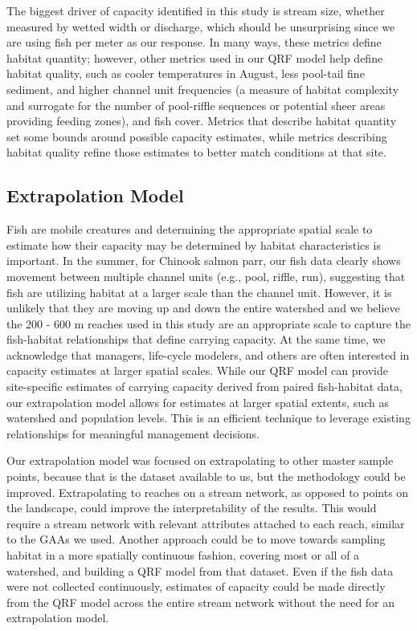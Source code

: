 \documentclass[
  12pt,
]{article}
\begin{document}
The biggest driver of capacity identified in this study is stream size, whether measured by wetted width or discharge, which should be unsurprising since we are using fish per meter as our response. In many ways, these metrics define habitat quantity; however, other metrics used in our QRF model help define habitat quality, such as cooler temperatures in August, less pool-tail fine sediment, and higher channel unit frequencies (a measure of habitat complexity and surrogate for the number of pool-riffle sequences or potential sheer areas providing feeding zones), and fish cover. Metrics that describe habitat quantity set some bounds around possible capacity estimates, while metrics describing habitat quality refine those estimates to better match conditions at that site.

\hypertarget{extrapolation-model}{%
\subsection{Extrapolation Model}\label{extrapolation-model}}

Fish are mobile creatures and determining the appropriate spatial scale to estimate how their capacity may be determined by habitat characteristics is important. In the summer, for Chinook salmon parr, our fish data clearly shows movement between multiple channel units (e.g., pool, riffle, run), suggesting that fish are utilizing habitat at a larger scale than the channel unit. However, it is unlikely that they are moving up and down the entire watershed and we believe the 200 - 600 m reaches used in this study are an appropriate scale to capture the fish-habitat relationships that define carrying capacity. At the same time, we acknowledge that managers, life-cycle modelers, and others are often interested in capacity estimates at larger spatial scales. While our QRF model can provide site-specific estimates of carrying capacity derived from paired fish-habitat data, our extrapolation model allows for estimates at larger spatial extents, such as watershed and population levels. This is an efficient technique to leverage existing relationships for meaningful management decisions.

Our extrapolation model was focused on extrapolating to other master sample points, because that is the dataset available to us, but the methodology could be improved. Extrapolating to reaches on a stream network, as opposed to points on the landscape, could improve the interpretability of the results. This would require a stream network with relevant attributes attached to each reach, similar to the GAAs we used. Another approach could be to move towards sampling habitat in a more spatially continuous fashion, covering most or all of a watershed, and building a QRF model from that dataset. Even if the fish data were not collected continuously, estimates of capacity could be made directly from the QRF model across the entire stream network without the need for an extrapolation model.
\end{document}
